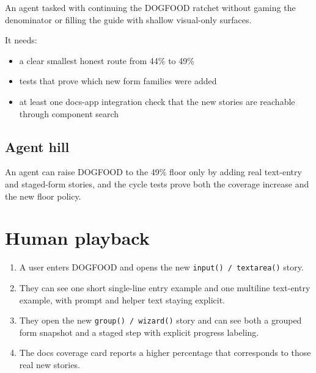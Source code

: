 An agent tasked with continuing the DOGFOOD ratchet without gaming the denominator or filling the guide with shallow visual-only surfaces.

It needs:

\begin{itemize}
\tightlist
\item
  a clear smallest honest route from 44\% to 49\%
\item
  tests that prove which new form families were added
\item
  at least one docs-app integration check that the new stories are reachable through component search
\end{itemize}

\subsection{Agent hill}\label{record-073-agent-hill}

An agent can raise DOGFOOD to the 49\% floor only by adding real text-entry and staged-form stories, and the cycle tests prove both the coverage increase and the new floor policy.

\section{Human playback}\label{record-073-human-playback}

\begin{enumerate}
\def\labelenumi{\arabic{enumi}.}
\tightlist
\item
  A user enters DOGFOOD and opens the new \texttt{i\allowbreak{}n\allowbreak{}p\allowbreak{}u\allowbreak{}t\allowbreak{}(\allowbreak{})\allowbreak{} \allowbreak{}/\allowbreak{} \allowbreak{}t\allowbreak{}e\allowbreak{}x\allowbreak{}t\allowbreak{}a\allowbreak{}r\allowbreak{}e\allowbreak{}a\allowbreak{}(\allowbreak{})} story.
\item
  They can see one short single-line entry example and one multiline text-entry example, with prompt and helper text staying explicit.
\item
  They open the new \texttt{g\allowbreak{}r\allowbreak{}o\allowbreak{}u\allowbreak{}p\allowbreak{}(\allowbreak{})\allowbreak{} \allowbreak{}/\allowbreak{} \allowbreak{}w\allowbreak{}i\allowbreak{}z\allowbreak{}a\allowbreak{}r\allowbreak{}d\allowbreak{}(\allowbreak{})} story and can see both a grouped form snapshot and a staged step with explicit progress labeling.
\item
  The docs coverage card reports a higher percentage that corresponds to those real new stories.
\end{enumerate}

